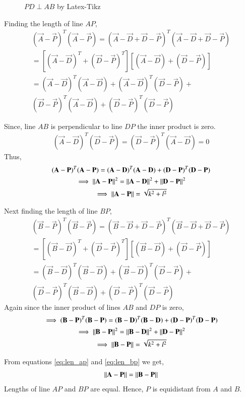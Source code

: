 \documentclass[journal,12pt,twocolumn]{IEEEtran}
\begin{document}
\renewcommand{\thefigure}{1}
\begin{figure}[!ht]
\centering
\resizebox{\columnwidth}{!}{}
\caption{$PD \perp AB$ by Latex-Tikz}
\label{fig:perp_bisector}
\end{figure}


Finding the length of line $AP$, 
\begin{multline}
    (\vec{A}-\vec{P})^T(\vec{A}-\vec{P}) = (\vec{A}- \vec{D}+\vec{D}-\vec{P})^T(\vec{A}-\vec{D}+\vec{D}-\vec{P}) \\
    =[(\vec{A}-\vec{D})^T+(\vec{D}-\vec{P})^T][(\vec{A}-\vec{D})+(\vec{D}-\vec{P})] \\
    =(\vec{A}-\vec{D})^T(\vec{A}-\vec{D}) + (\vec{A}-\vec{D})^T(\vec{D}-\vec{P}) + \\ (\vec{D}-\vec{P})^T(\vec{A}-\vec{D}) + (\vec{D}-\vec{P})^T(\vec{D}-\vec{P})
\end{multline}

Since, line $AB$ is perpendicular to line $DP$ the inner product is zero. 
\begin{align}
    (\vec{A}-\vec{D})^T(\vec{D}-\vec{P}) = (\vec{D}-\vec{P})^T(\vec{A}-\vec{D}) = 0
\end{align}
Thus, 
\begin{multline} \label{eq:len_ap}
    (\mathbf{A}-\mathbf{P})^T(\mathbf{A}-\mathbf{P}) = (\mathbf{A}-\mathbf{D})^T(\mathbf{A}-\mathbf{D}) + (\mathbf{D}-\mathbf{P})^T(\mathbf{D}-\mathbf{P}) \\
  \implies\left\lVert\mathbf{A}-\mathbf{P}\right\rVert^2 = \left\lVert\mathbf{A}-\mathbf{D}\right\rVert^2 + \left\lVert\mathbf{D}-\mathbf{P}\right\rVert^2 \\
  \implies\left\lVert\mathbf{A}-\mathbf{P}\right\rVert = \sqrt{k^2+l^2}
\end{multline}

Next finding the length of line $BP$,
\begin{multline}
    (\vec{B}-\vec{P})^T(\vec{B}-\vec{P}) = (\vec{B}- \vec{D}+\vec{D}-\vec{P})^T(\vec{B}-\vec{D}+\vec{D}-\vec{P}) \\
    =[(\vec{B}-\vec{D})^T+(\vec{D}-\vec{P})^T][(\vec{B}-\vec{D})+(\vec{D}-\vec{P})] \\
    =(\vec{B}-\vec{D})^T(\vec{B}-\vec{D}) + (\vec{B}-\vec{D})^T(\vec{D}-\vec{P}) + \\ (\vec{D}-\vec{P})^T(\vec{B}-\vec{D}) + (\vec{D}-\vec{P})^T(\vec{D}-\vec{P})
\end{multline}
Again since the inner product of lines $AB$ and $DP$ is zero, 
\begin{multline} \label{eq:len_bp}
  \implies(\mathbf{B}-\mathbf{P})^T(\mathbf{B}-\mathbf{P}) = (\mathbf{B}-\mathbf{D})^T(\mathbf{B}-\mathbf{D}) + (\mathbf{D}-\mathbf{P})^T(\mathbf{D}-\mathbf{P}) \\
  \implies\left\lVert\mathbf{B}-\mathbf{P}\right\rVert^2 = \left\lVert\mathbf{B}-\mathbf{D}\right\rVert^2 + \left\lVert\mathbf{D}-\mathbf{P}\right\rVert^2 \\
  \implies\left\lVert\mathbf{B}-\mathbf{P}\right\rVert = \sqrt{k^2+l^2}
\end{multline}

From equations \eqref{eq:len_ap} and \eqref{eq:len_bp} we get, 
\begin{align}
    \left\lVert\mathbf{A}-\mathbf{P}\right\rVert = \left\lVert\mathbf{B}-\mathbf{P}\right\rVert
\end{align}
Lengths of line $AP$ and $BP$ are equal. Hence, $P$ is equidistant from $A$ and $B$. 
\end{document}

